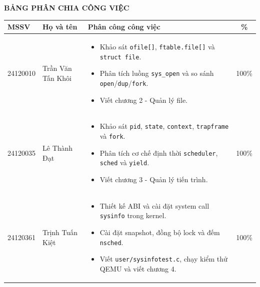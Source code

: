\newpage

\thispagestyle{empty}

\begin{center}
    \Large\textbf{BẢNG PHÂN CHIA CÔNG VIỆC}
\end{center}

\begin{table}[H]
    \centering
    \renewcommand{\arraystretch}{1.3}
    \setlength{\tabcolsep}{6pt}
    \setlength{\arrayrulewidth}{1pt}

    \begin{tabularx}{\textwidth}{|p{2cm}|p{4cm}|X|c|}
        \hline
        \rowcolor[rgb]{0.8, 0.9, 1.0}
        \textbf{MSSV} & \textbf{Họ và tên} & \textbf{Phân công công việc} & \textbf{\%} \\ \hline

        24120010 & Trần Văn Tấn Khôi &
        \vspace{-0.5\baselineskip}
        \begin{itemize}[itemsep=0pt, topsep=0pt, partopsep=0pt, parsep=0pt]
            \item Khảo sát \texttt{ofile[]}, \texttt{ftable.file[]} và \texttt{struct file}.
            \item Phân tích luồng \texttt{sys\_open} và so sánh \texttt{open}/\texttt{dup}/\texttt{fork}.
            \item Viết chương 2 - Quản lý file.
        \end{itemize} & 100\% \\ \hline

        24120035 & Lê Thành Đạt & 
        \vspace{-0.5\baselineskip}
        \begin{itemize}[itemsep=0pt, topsep=0pt, partopsep=0pt, parsep=0pt]
            \item Khảo sát \texttt{pid}, \texttt{state}, \texttt{context}, \texttt{trapframe} và \texttt{fork}.
            \item Phân tích cơ chế định thời \texttt{scheduler}, \texttt{sched} và \texttt{yield}.
            \item Viết chương 3 - Quản lý tiến trình.
        \end{itemize} & 100\% \\ \hline

        24120361 & Trịnh Tuấn Kiệt & 
        \vspace{-0.5\baselineskip}
        \begin{itemize}[itemsep=0pt, topsep=0pt, partopsep=0pt, parsep=0pt]
            \item Thiết kế ABI và cài đặt system call \texttt{sysinfo} trong kernel.
            \item Cài đặt snapshot, đồng bộ lock và đếm \texttt{nsched}.
            \item Viết \texttt{user/sysinfotest.c}, chạy kiểm thử QEMU và viết chương 4.
        \end{itemize} & 100\% \\ \hline 
    \end{tabularx}
\end{table}
